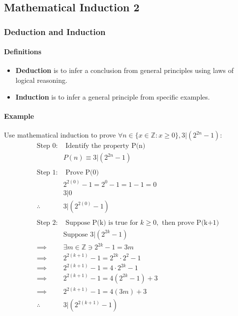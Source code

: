 \subsection{Mathematical Induction 2}
\hrulefill
\subsubsection*{Deduction and Induction}
\paragraph*{Definitions}
\begin{itemize}
    \item \textbf{Deduction} is to infer a conclusion from general principles using laws of logical reasoning.
    \item \textbf{Induction} is to infer a general principle from specific examples.
\end{itemize}

\paragraph*{Example}
Use mathematical induction to prove \newline $\forall n \in \{x \in \mathbb{Z} : x \geq 0\}, 3 | (2^{2n}-1)$:
\begin{align*}
    \text{Step 0:}& \text{ Identify the property P(n)}\\
    &P(n) \equiv 3 | (2^{2n}-1)\\
    \\
    \text{Step 1:}& \text{ Prove P(0)}\\
    & 2^{2(0)} - 1 = 2^0 - 1 = 1 - 1 = 0\\
    & 3 | 0\\
    \therefore \quad & 3 | (2^{2(0)} - 1)\\
    \\
    \text{Step 2:}& \text{ Suppose P(k) is true for } k \geq 0, \text{ then prove P(k+1)}\\
    &\text{Suppose } 3 | (2^{2k} - 1)\\
    \implies& \exists m \in \mathbb{Z} \ni 2^{2k} - 1 = 3m\\
    \implies& 2^{2(k+1)}-1 = 2^{2k} \cdot 2^{2} - 1\\
    \implies& 2^{2(k+1)}-1 = 4 \cdot 2^{2k} - 1\\
    \implies& 2^{2(k+1)}-1 = 4(2^{2k} - 1) + 3\\
    \implies& 2^{2(k+1)}-1 = 4(3m) + 3\\
    \therefore \quad & 3 | (2^{2(k+1)} - 1)\\
\end{align*}

